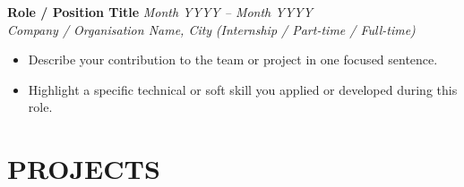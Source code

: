 \documentclass[a4paper,10pt]{article}
\begin{document}
\vspace{4pt}

\textbf{Role / Position Title} \hfill \textit{Month YYYY -- Month YYYY}\\
\textit{Company / Organisation Name, City} \hfill \textit{(Internship / Part-time / Full-time)}
\begin{itemize}
    \item Describe your contribution to the team or project in one focused sentence.
    \item Highlight a specific technical or soft skill you applied or developed during this role.
\end{itemize}

\section{PROJECTS}
\end{document}
